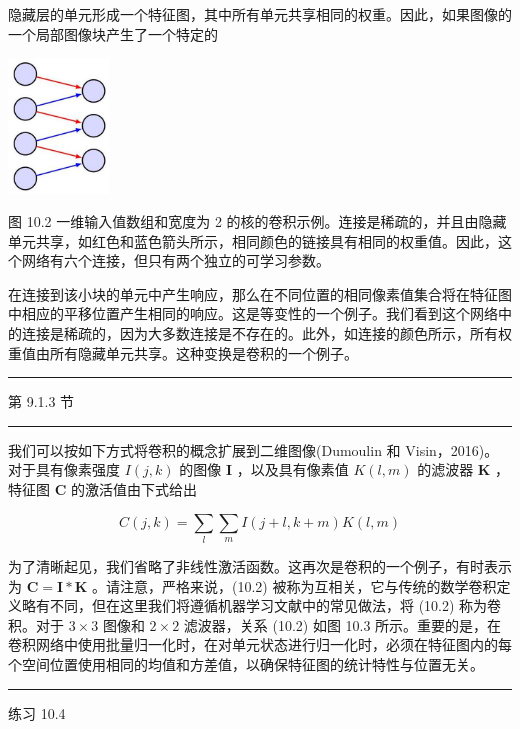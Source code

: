 \documentclass[10pt]{article}
\newcommand{\HRule}{\begin{center}\rule{0.9\linewidth}{0.2mm}\end{center}}
\begin{document}
隐藏层的单元形成一个特征图，其中所有单元共享相同的权重。因此，如果图像的一个局部图像块产生了一个特定的

\begin{center}
\includegraphics[max width=0.2\textwidth]{images/0194e279-9b28-703a-88f4-c3ac21e2010d_311_1204_345_286_384_0.jpg}
\end{center}
\hspace*{3em} 

图 10.2 一维输入值数组和宽度为 2 的核的卷积示例。连接是稀疏的，并且由隐藏单元共享，如红色和蓝色箭头所示，相同颜色的链接具有相同的权重值。因此，这个网络有六个连接，但只有两个独立的可学习参数。

在连接到该小块的单元中产生响应，那么在不同位置的相同像素值集合将在特征图中相应的平移位置产生相同的响应。这是等变性的一个例子。我们看到这个网络中的连接是稀疏的，因为大多数连接是不存在的。此外，如连接的颜色所示，所有权重值由所有隐藏单元共享。这种变换是卷积的一个例子。

\HRule

第 9.1.3 节

\HRule

我们可以按如下方式将卷积的概念扩展到二维图像(Dumoulin 和 Visin，2016)。对于具有像素强度 \(I\left( {j,k}\right)\) 的图像 \(\mathbf{I}\) ，以及具有像素值 \(K\left( {l,m}\right)\) 的滤波器 \(\mathbf{K}\) ，特征图 \(\mathbf{C}\) 的激活值由下式给出

\[
C\left( {j,k}\right)  = \mathop{\sum }\limits_{l}\mathop{\sum }\limits_{m}I\left( {j + l,k + m}\right) K\left( {l,m}\right)  \tag{10.2}
\]

为了清晰起见，我们省略了非线性激活函数。这再次是卷积的一个例子，有时表示为 \(\mathbf{C} = \mathbf{I} * \mathbf{K}\) 。请注意，严格来说，(10.2) 被称为互相关，它与传统的数学卷积定义略有不同，但在这里我们将遵循机器学习文献中的常见做法，将 (10.2) 称为卷积。对于 \(3 \times  3\) 图像和 \(2 \times  2\) 滤波器，关系 (10.2) 如图 10.3 所示。重要的是，在卷积网络中使用批量归一化时，在对单元状态进行归一化时，必须在特征图内的每个空间位置使用相同的均值和方差值，以确保特征图的统计特性与位置无关。

\HRule

练习 10.4
\end{document}
